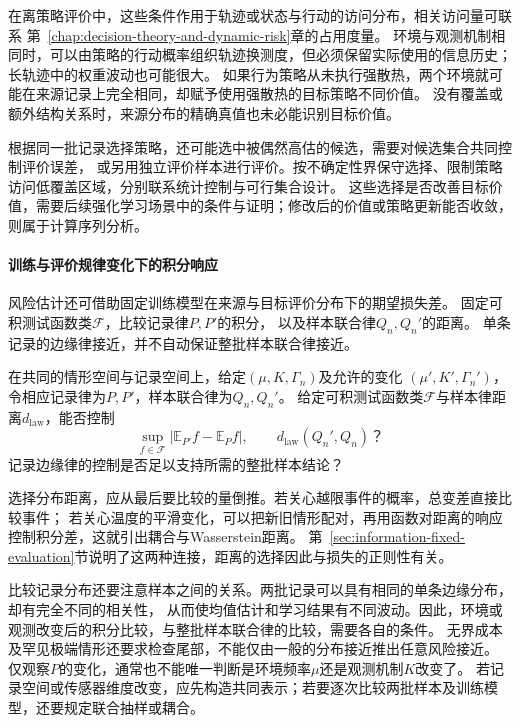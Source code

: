 在离策略评价中，这些条件作用于轨迹或状态与行动的访问分布，相关访问量可联系
第~\ref{chap:decision-theory-and-dynamic-risk}章的占用度量。
环境与观测机制相同时，可以由策略的行动概率组织轨迹换测度，但必须保留实际使用的信息历史；
长轨迹中的权重波动也可能很大。
如果行为策略从未执行强散热，两个环境就可能在来源记录上完全相同，却赋予使用强散热的目标策略不同价值。
没有覆盖或额外结构关系时，来源分布的精确真值也未必能识别目标价值。

根据同一批记录选择策略，还可能选中被偶然高估的候选，需要对候选集合共同控制评价误差，
或另用独立评价样本进行评价。按不确定性界保守选择、限制策略访问低覆盖区域，分别联系统计控制与可行集合设计。
这些选择是否改善目标价值，需要后续强化学习场景中的条件与证明；修改后的价值或策略更新能否收敛，则属于计算序列分析。

\paragraph{训练与评价规律变化下的积分响应}
\label{sec:future-analysis-data-law-perturbation}

风险估计还可借助固定训练模型在来源与目标评价分布下的期望损失差。
固定可积测试函数类$\mathcal F$，比较记录律$P,P'$的积分，
以及样本联合律$Q_n,Q_n'$的距离。
单条记录的边缘律接近，并不自动保证整批样本联合律接近。

\begin{mathproblem}[观测规律与风险积分的扰动]
  \label{question:future-data-law-perturbation}
  在共同的情形空间与记录空间上，给定$(\mu,K,\Gamma_n)$及允许的变化
  $(\mu',K',\Gamma_n')$，令相应记录律为$P,P'$，样本联合律为$Q_n,Q_n'$。
  给定可积测试函数类$\mathcal F$与样本律距离$d_{\mathrm{law}}$，能否控制
  \[
    \sup_{f\in\mathcal F}|\mathbb E_{P'}f-\mathbb E_Pf|,
    \qquad d_{\mathrm{law}}(Q_n',Q_n)\text{？}
  \]
  记录边缘律的控制是否足以支持所需的整批样本结论？
\end{mathproblem}

选择分布距离，应从最后要比较的量倒推。若关心越限事件的概率，总变差直接比较事件；
若关心温度的平滑变化，可以把新旧情形配对，再用函数对距离的响应控制积分差，这就引出耦合与Wasserstein距离。
第~\ref{sec:information-fixed-evaluation}节说明了这两种连接，距离的选择因此与损失的正则性有关。

比较记录分布还要注意样本之间的关系。两批记录可以具有相同的单条边缘分布，却有完全不同的相关性，
从而使均值估计和学习结果有不同波动。因此，环境或观测改变后的积分比较，与整批样本联合律的比较，需要各自的条件。
无界成本及罕见极端情形还要求检查尾部，不能仅由一般的分布接近推出任意风险接近。
仅观察$P$的变化，通常也不能唯一判断是环境频率$\mu$还是观测机制$K$改变了。
若记录空间或传感器维度改变，应先构造共同表示；若要逐次比较两批样本及训练模型，还要规定联合抽样或耦合。

